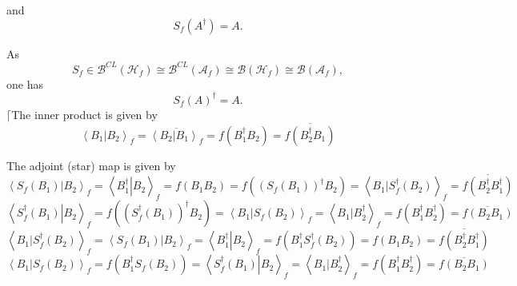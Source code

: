 \documentclass[aps,preprint]{revtex4}%
\begin{document}
and
\begin{equation}
S_{f}\left(  A^{\dagger}\right)  =A.
\end{equation}


As
\begin{equation}
S_{f}\in\mathcal{B}^{CL}\left(  \mathcal{H}_{f}\right)  \cong\mathcal{B}%
^{CL}\left(  \mathcal{A}_{f}\right)  \cong\mathcal{B}\left(  \mathcal{H}%
_{f}\right)  \cong\mathcal{B}\left(  \mathcal{A}_{f}\right)  ,
\end{equation}
one has
\begin{equation}
S_{f}\left(  A\right)  ^{\dagger}=A.
\end{equation}
$\lceil$The inner product is given by
\begin{equation}
\left\langle \left.  B_{1}\right\vert B_{2}\right\rangle _{f}=\overline
{\left\langle \left.  B_{2}\right\vert B_{1}\right\rangle _{f}}=f\left(
B_{1}^{\dagger}B_{2}\right)  =\overline{f\left(  B_{2}^{\dagger}B_{1}\right)
}%
\end{equation}


The adjoint (star) map is given by
\begin{equation}
\left\langle \left.  S_{f}\left(  B_{1}\right)  \right\vert B_{2}\right\rangle
_{f}=\left\langle \left.  B_{1}^{\dagger}\right\vert B_{2}\right\rangle
_{f}=f\left(  B_{1}B_{2}\right)  =f\left(  \left(  S_{f}\left(  B_{1}\right)
\right)  ^{\dagger}B_{2}\right)  =\left\langle \left.  B_{1}\right\vert
S_{f}^{\dagger}\left(  B_{2}\right)  \right\rangle _{f}=\overline{f\left(
B_{2}^{\dagger}B_{1}^{\dagger}\right)  }%
\end{equation}%
\begin{equation}
\left\langle \left.  S_{f}^{\dagger}\left(  B_{1}\right)  \right\vert
B_{2}\right\rangle _{f}=f\left(  \left(  S_{f}^{\dagger}\left(  B_{1}\right)
\right)  ^{\dagger}B_{2}\right)  =\left\langle \left.  B_{1}\right\vert
S_{f}\left(  B_{2}\right)  \right\rangle _{f}=\left\langle \left.
B_{1}\right\vert B_{2}^{\dagger}\right\rangle _{f}=f\left(  B_{1}^{\dagger
}B_{2}^{\dagger}\right)  =\overline{f\left(  B_{2}B_{1}\right)  }%
\end{equation}%
\begin{equation}
\left\langle \left.  B_{1}\right\vert S_{f}^{\dagger}\left(  B_{2}\right)
\right\rangle _{f}=\left\langle \left.  S_{f}\left(  B_{1}\right)  \right\vert
B_{2}\right\rangle _{f}=\left\langle \left.  B_{1}^{\dagger}\right\vert
B_{2}\right\rangle _{f}=f\left(  B_{1}^{\dagger}S_{f}^{\dagger}\left(
B_{2}\right)  \right)  =f\left(  B_{1}B_{2}\right)  =\overline{f\left(
B_{2}^{\dagger}B_{1}^{\dagger}\right)  }%
\end{equation}%
\begin{equation}
\left\langle \left.  B_{1}\right\vert S_{f}\left(  B_{2}\right)  \right\rangle
_{f}=f\left(  B_{1}^{\dagger}S_{f}\left(  B_{2}\right)  \right)  =\left\langle
\left.  S_{f}^{\dagger}\left(  B_{1}\right)  \right\vert B_{2}\right\rangle
_{f}=\left\langle \left.  B_{1}\right\vert B_{2}^{\dagger}\right\rangle
_{f}=f\left(  B_{1}^{\dagger}B_{2}^{\dagger}\right)  =\overline{f\left(
B_{2}B_{1}\right)  }%
\end{equation}
\end{document}
